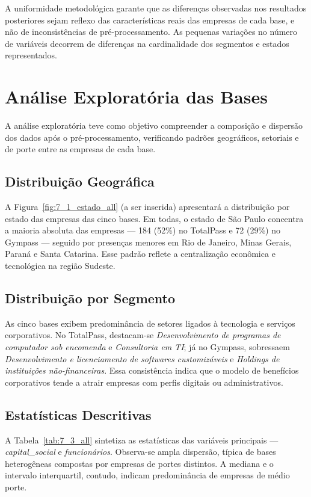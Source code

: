A uniformidade metodológica garante que as diferenças observadas nos resultados posteriores sejam reflexo das características reais das empresas de cada base, e não de inconsistências de pré-processamento. As pequenas variações no número de variáveis decorrem de diferenças na cardinalidade dos segmentos e estados representados.

\section{Análise Exploratória das Bases}

A análise exploratória teve como objetivo compreender a composição e dispersão dos dados após o pré-processamento, verificando padrões geográficos, setoriais e de porte entre as empresas de cada base.

\subsection*{Distribuição Geográfica}

A Figura~\ref{fig:7_1_estado_all} (a ser inserida) apresentará a distribuição por estado das empresas das cinco bases. Em todas, o estado de São Paulo concentra a maioria absoluta das empresas — 184 (52\%) no TotalPass e 72 (29\%) no Gympass — seguido por presenças menores em Rio de Janeiro, Minas Gerais, Paraná e Santa Catarina. Esse padrão reflete a centralização econômica e tecnológica na região Sudeste.

\subsection*{Distribuição por Segmento}

As cinco bases exibem predominância de setores ligados à tecnologia e serviços corporativos. No TotalPass, destacam-se \textit{Desenvolvimento de programas de computador sob encomenda} e \textit{Consultoria em TI}; já no Gympass, sobressaem \textit{Desenvolvimento e licenciamento de softwares customizáveis} e \textit{Holdings de instituições não-financeiras}. Essa consistência indica que o modelo de benefícios corporativos tende a atrair empresas com perfis digitais ou administrativos.

\subsection*{Estatísticas Descritivas}

A Tabela~\ref{tab:7_3_all} sintetiza as estatísticas das variáveis principais — \textit{capital\_social} e \textit{funcionários}. Observa-se ampla dispersão, típica de bases heterogêneas compostas por empresas de portes distintos. A mediana e o intervalo interquartil, contudo, indicam predominância de empresas de médio porte.

